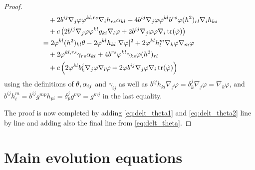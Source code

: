 \documentclass{amsart}
\begin{document}
\begin{proof}
\begin{equation}
\begin{split}
&\quad + 2 b^{ij} \nabla_j\varphi \varphi^{kl,rs}\nabla_i h_{rs} \alpha_{kl}  + 4 b^{ij} \nabla_j\varphi \varphi^{kl} b^{rs} \varphi(h^2)_{rl} \nabla_i h_{ks} \\
&\quad + c\left(2 b^{ij} \nabla_j\varphi \varphi^{kl}g_{ki} \nabla_l \varphi + 2 b^{ij} \nabla_j\varphi \varphi \nabla_i \operatorname{tr}(\dot{\varphi})\right) \\
&= 2 \varphi^{kl}(h^2)_{kl}\theta - 2 \varphi^{kl}h_{kl} |\nabla\varphi|^2 + 2 \varphi^{kl} h^{m}_{l} \nabla_k\varphi \nabla_m \varphi \\
&\quad + 2 \varphi^{kl,rs} \gamma_{rs} \alpha_{kl} + 4 b^{rs} \varphi^{kl} \gamma_{ks} \varphi(h^2)_{rl} \\
&\quad + c\left(2 \varphi^{kl} b^j_k \nabla_j\varphi \nabla_l \varphi + 2 \varphi b^{ij} \nabla_j\varphi \nabla_i \operatorname{tr}(\dot{\varphi})\right)
\end{split}
\end{equation}
using the definitions of \(\theta, \alpha_{ij}\) and \(\gamma_{ij}\) as well as \(b^{ij}h_{ki} \nabla_j \varphi = \delta^j_k \nabla_j \varphi = \nabla_k \varphi\), and \(b^{ij} h^m_i = b^{ij} g^{mp}h_{pi} = \delta^j_p g^{mp} = g^{mj}\) in the last equality.

The proof is now completed by adding \cref{eq:delt_theta1} and \cref{eq:delt_theta2} line by line and adding also the final line from \cref{eq:delt_theta}.
\end{proof}

\section{Main evolution equations}
\label{sec:main_evolution}
\end{document}
